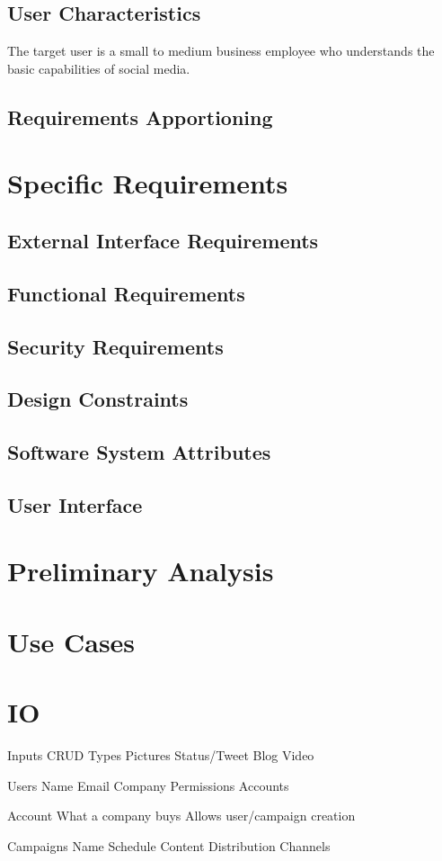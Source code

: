 \documentclass{article}
\begin{document}
	\subsection{User Characteristics}
        The target user is a small to medium business employee who understands
        the basic capabilities of social media.
        
	\subsection{Requirements Apportioning}

\section{Specific Requirements}
	\subsection{External Interface Requirements}
	\subsection{Functional Requirements}
	\subsection{Security Requirements}
	\subsection{Design Constraints}
	\subsection{Software System Attributes}
	\subsection{User Interface}

\section{Preliminary Analysis}

\section{Use Cases}

\section{IO}

Inputs
  CRUD
  Types
    Pictures
    Status/Tweet
    Blog
    Video

Users
  Name
  Email
  Company
  Permissions
  Accounts
    
Account
  What a company buys
  Allows user/campaign creation
  
Campaigns
  Name
  Schedule
  Content
    Distribution Channels
\end{document}
